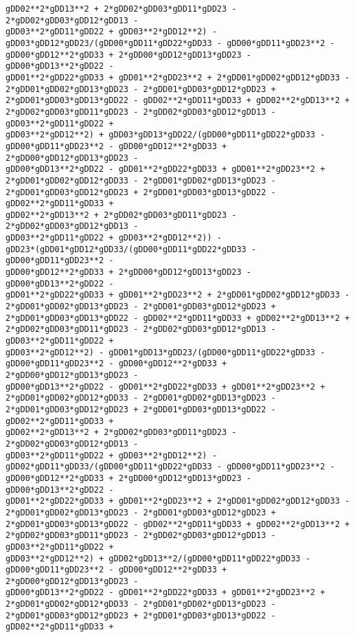 \documentclass[landscape,letterpaper,10pt,english]{article}
\begin{document}
\begin{Verbatim}[commandchars=\\\{\}]
gDD02**2*gDD13**2 + 2*gDD02*gDD03*gDD11*gDD23 - 2*gDD02*gDD03*gDD12*gDD13 -
gDD03**2*gDD11*gDD22 + gDD03**2*gDD12**2) -
gDD03*gDD12*gDD23/(gDD00*gDD11*gDD22*gDD33 - gDD00*gDD11*gDD23**2 -
gDD00*gDD12**2*gDD33 + 2*gDD00*gDD12*gDD13*gDD23 - gDD00*gDD13**2*gDD22 -
gDD01**2*gDD22*gDD33 + gDD01**2*gDD23**2 + 2*gDD01*gDD02*gDD12*gDD33 -
2*gDD01*gDD02*gDD13*gDD23 - 2*gDD01*gDD03*gDD12*gDD23 +
2*gDD01*gDD03*gDD13*gDD22 - gDD02**2*gDD11*gDD33 + gDD02**2*gDD13**2 +
2*gDD02*gDD03*gDD11*gDD23 - 2*gDD02*gDD03*gDD12*gDD13 - gDD03**2*gDD11*gDD22 +
gDD03**2*gDD12**2) + gDD03*gDD13*gDD22/(gDD00*gDD11*gDD22*gDD33 -
gDD00*gDD11*gDD23**2 - gDD00*gDD12**2*gDD33 + 2*gDD00*gDD12*gDD13*gDD23 -
gDD00*gDD13**2*gDD22 - gDD01**2*gDD22*gDD33 + gDD01**2*gDD23**2 +
2*gDD01*gDD02*gDD12*gDD33 - 2*gDD01*gDD02*gDD13*gDD23 -
2*gDD01*gDD03*gDD12*gDD23 + 2*gDD01*gDD03*gDD13*gDD22 - gDD02**2*gDD11*gDD33 +
gDD02**2*gDD13**2 + 2*gDD02*gDD03*gDD11*gDD23 - 2*gDD02*gDD03*gDD12*gDD13 -
gDD03**2*gDD11*gDD22 + gDD03**2*gDD12**2)) -
gDD23*(gDD01*gDD12*gDD33/(gDD00*gDD11*gDD22*gDD33 - gDD00*gDD11*gDD23**2 -
gDD00*gDD12**2*gDD33 + 2*gDD00*gDD12*gDD13*gDD23 - gDD00*gDD13**2*gDD22 -
gDD01**2*gDD22*gDD33 + gDD01**2*gDD23**2 + 2*gDD01*gDD02*gDD12*gDD33 -
2*gDD01*gDD02*gDD13*gDD23 - 2*gDD01*gDD03*gDD12*gDD23 +
2*gDD01*gDD03*gDD13*gDD22 - gDD02**2*gDD11*gDD33 + gDD02**2*gDD13**2 +
2*gDD02*gDD03*gDD11*gDD23 - 2*gDD02*gDD03*gDD12*gDD13 - gDD03**2*gDD11*gDD22 +
gDD03**2*gDD12**2) - gDD01*gDD13*gDD23/(gDD00*gDD11*gDD22*gDD33 -
gDD00*gDD11*gDD23**2 - gDD00*gDD12**2*gDD33 + 2*gDD00*gDD12*gDD13*gDD23 -
gDD00*gDD13**2*gDD22 - gDD01**2*gDD22*gDD33 + gDD01**2*gDD23**2 +
2*gDD01*gDD02*gDD12*gDD33 - 2*gDD01*gDD02*gDD13*gDD23 -
2*gDD01*gDD03*gDD12*gDD23 + 2*gDD01*gDD03*gDD13*gDD22 - gDD02**2*gDD11*gDD33 +
gDD02**2*gDD13**2 + 2*gDD02*gDD03*gDD11*gDD23 - 2*gDD02*gDD03*gDD12*gDD13 -
gDD03**2*gDD11*gDD22 + gDD03**2*gDD12**2) -
gDD02*gDD11*gDD33/(gDD00*gDD11*gDD22*gDD33 - gDD00*gDD11*gDD23**2 -
gDD00*gDD12**2*gDD33 + 2*gDD00*gDD12*gDD13*gDD23 - gDD00*gDD13**2*gDD22 -
gDD01**2*gDD22*gDD33 + gDD01**2*gDD23**2 + 2*gDD01*gDD02*gDD12*gDD33 -
2*gDD01*gDD02*gDD13*gDD23 - 2*gDD01*gDD03*gDD12*gDD23 +
2*gDD01*gDD03*gDD13*gDD22 - gDD02**2*gDD11*gDD33 + gDD02**2*gDD13**2 +
2*gDD02*gDD03*gDD11*gDD23 - 2*gDD02*gDD03*gDD12*gDD13 - gDD03**2*gDD11*gDD22 +
gDD03**2*gDD12**2) + gDD02*gDD13**2/(gDD00*gDD11*gDD22*gDD33 -
gDD00*gDD11*gDD23**2 - gDD00*gDD12**2*gDD33 + 2*gDD00*gDD12*gDD13*gDD23 -
gDD00*gDD13**2*gDD22 - gDD01**2*gDD22*gDD33 + gDD01**2*gDD23**2 +
2*gDD01*gDD02*gDD12*gDD33 - 2*gDD01*gDD02*gDD13*gDD23 -
2*gDD01*gDD03*gDD12*gDD23 + 2*gDD01*gDD03*gDD13*gDD22 - gDD02**2*gDD11*gDD33 +

\end{Verbatim}
\end{document}
